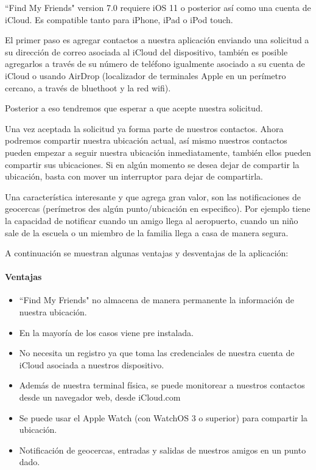 ``Find My Friends" version 7.0 requiere iOS 11 o posterior así como una cuenta de iCloud. Es compatible tanto para iPhone, iPad o iPod touch.

El primer paso es agregar contactos a nuestra aplicación enviando una solicitud a su dirección de correo asociada al iCloud del dispositivo, también es posible agregarlos a través de su número de teléfono igualmente asociado a su cuenta de iCloud o usando AirDrop (localizador de terminales Apple en un perímetro cercano, a través de bluethoot y la red wifi).

Posterior a eso tendremos que esperar a que acepte nuestra solicitud.

Una vez aceptada la solicitud ya forma parte de nuestros contactos. Ahora podremos compartir nuestra ubicación actual, así mismo nuestros contactos pueden empezar a seguir nuestra ubicación inmediatamente, también ellos pueden compartir sus ubicaciones. Si en algún momento se desea dejar de compartir la ubicación, basta con mover un interruptor para dejar de compartirla.

Una característica interesante y que agrega gran valor, son las notificaciones de geocercas (perímetros des algún punto/ubicación en especifico). Por ejemplo tiene la capacidad de notificar cuando un amigo llega al aeropuerto, cuando un niño sale de la escuela o un miembro de la familia llega a casa de manera segura. \cite{findmyfriends}

A continuación se muestran algunas ventajas y desventajas de la aplicación:

\paragraph{Ventajas}

\begin{itemize}
    \item ``Find My Friends" no almacena de manera permanente la información de nuestra ubicación.
    \item En la mayoría de los casos viene pre instalada.
    \item No necesita un registro ya que toma las credenciales de nuestra cuenta de iCloud asociada a nuestros dispositivo.
    \item Además de nuestra terminal física, se puede monitorear a nuestros contactos desde un navegador web, desde iCloud.com
    \item Se puede usar el Apple Watch (con WatchOS 3 o superior) para compartir la ubicación.
    \item Notificación de geocercas, entradas y salidas de nuestros amigos en un punto dado.
\end{itemize}

